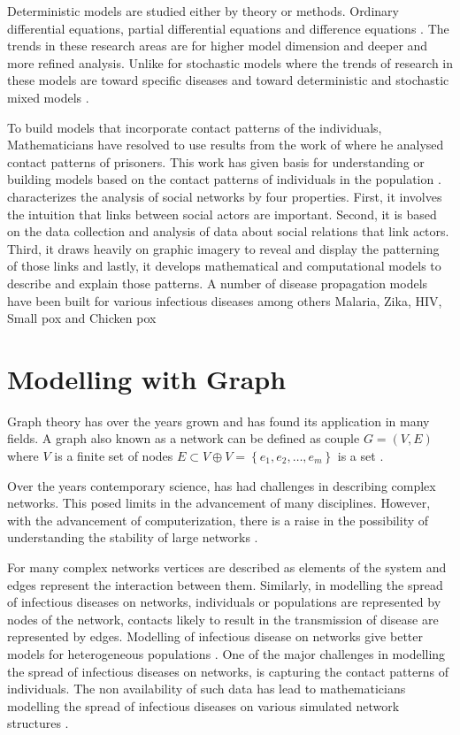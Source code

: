 Deterministic models are studied either by theory or methods.
Ordinary differential equations, partial differential equations and difference equations \citep{keeling2008modeling}.
The trends in these research areas are for higher model dimension and deeper and more refined analysis. Unlike for stochastic models where the trends of research in these models are
toward specific diseases and toward deterministic and stochastic mixed models \citep{fu2013propagation}.


 
 To build models that incorporate contact patterns of the individuals, Mathematicians have resolved  to use results from the work of \cite{moreno1945application} where he analysed contact patterns of prisoners. This work has given basis for understanding or building models based on the contact patterns of individuals in the population \citep{sat}. \cite{freeman2004development} characterizes the analysis of social networks by four properties. First, it involves the intuition that links between social actors are important. Second, it is based on the data collection and analysis of data about social relations that link actors. Third, it draws heavily on graphic imagery to reveal and display the patterning of those links and lastly, it develops mathematical and computational models to describe and explain those patterns. 
A number of disease propagation models have been built for various infectious diseases among others Malaria, Zika, HIV, Small pox  and Chicken pox \citep{ding2016mathematical}


\section{Modelling with Graph}
Graph theory has over the years grown and has found its application in many fields. A graph also known as a network can be defined as couple $G = (V, E) $ where $V$ is a finite set of nodes $E \subset V \oplus V = \left\lbrace e_1,e_2,\dots, e_m \right\rbrace$ is a set \citep{estrada2012structure}.

Over the years contemporary science, has had challenges in describing complex networks. This posed limits in the advancement of many disciplines. However, with the advancement of computerization, there is a raise in the possibility of understanding the stability of large networks \cite{barabasi1999emergence}.

For many complex networks vertices are described as elements of the system and edges represent the interaction between them. Similarly, in modelling the spread of  infectious diseases on networks, individuals or populations are represented by nodes of the network, contacts likely to result in the transmission of disease are represented by edges. Modelling of infectious disease on networks give better models for heterogeneous populations \citep{ming2016stochastic}. One of the major challenges in modelling the spread of infectious diseases on networks, is capturing  the contact patterns of individuals. The non availability of such data has lead to mathematicians modelling the spread of infectious diseases on various simulated network structures \citep{pastor2001}.


